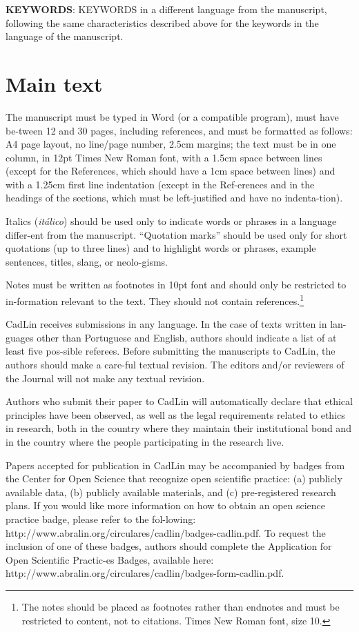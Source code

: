 \documentclass[12pt,a4paper]{article}
\begin{document}
\textbf{KEYWORDS}: KEYWORDS in a different language from the manuscript, following the same characteristics described above for the keywords in the language of the manuscript.


\section{Main text} 
The manuscript must be typed in Word (or a compatible program), must have be-tween 12 and 30 pages, including references, and must be formatted as follows: A4 page layout, no line/page number, 2.5cm margins; the text must be in one column, in 12pt Times New Roman font, with a 1.5cm space between lines (except for the References, which should have a 1cm space between lines) and with a 1.25cm first line indentation (except in the Ref-erences and in the headings of the sections, which must be left-justified and have no indenta-tion).

Italics (\textit{itálico}) should be used only to indicate words or phrases in a language differ-ent from the manuscript. “Quotation marks” should be used only for short quotations (up to three lines) and to highlight words or phrases, example sentences, titles, slang, or neolo-gisms. 

Notes must be written as footnotes in 10pt font and should only be restricted to in-formation relevant to the text. They should not contain references.\footnote{The notes should be placed as footnotes rather than endnotes and must be restricted to content, not to citations. Times New Roman font, size 10.}


CadLin receives submissions in any language. In the case of texts written in lan-guages other than Portuguese and English, authors should indicate a list of at least five pos-sible referees. Before submitting the manuscripts to CadLin, the authors should make a care-ful textual revision. The editors and/or reviewers of the Journal will not make any textual revision.

Authors who submit their paper to CadLin will automatically declare that ethical principles have been observed, as well as the legal requirements related to ethics in research, both in the country where they maintain their institutional bond and in the country where the people participating in the research live.

Papers accepted for publication in CadLin may be accompanied by badges from the Center for Open Science that recognize open scientific practice: (a) publicly available data, (b) publicly available materials, and (c) pre-registered research plans. If you would like more information on how to obtain an open science practice badge, please refer to the fol-lowing: http://www.abralin.org/circulares/cadlin/badges-cadlin.pdf. To request the inclusion of one of these badges, authors should complete the Application for Open Scientific Practic-es Badges, available here: http://www.abralin.org/circulares/cadlin/badges-form-cadlin.pdf.
\end{document}
